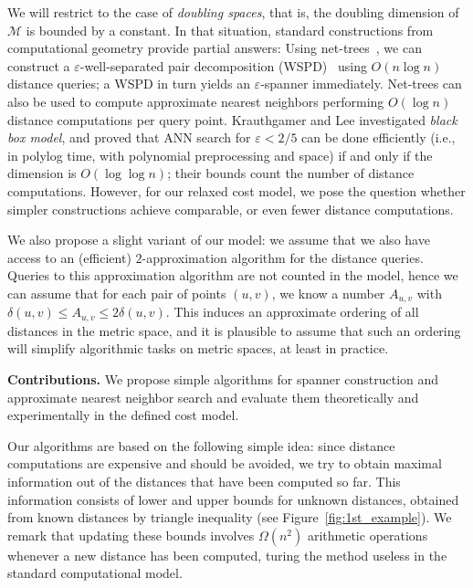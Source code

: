 \documentclass[a4paper,USenglish]{socg-lipics-v2018}
\newcommand{\eps}{\varepsilon}
\newcommand{\metricspace}{\mathcal{M}}
\newcommand{\dist}{\delta}
\newcommand{\myparagraph}[1]{\textbf{#1.}}
\begin{document}
We will restrict to the case of \emph{doubling spaces}, that is, the doubling dimension
of $\metricspace$ is bounded by a constant. 
In that situation, standard constructions from computational geometry provide partial answers:
Using net-trees~\cite{hm-fast}, we can construct a $\eps$-well-separated pair decomposition (WSPD)~\cite{CK-decomposition} using $O(n\log n)$ distance queries; a WSPD in turn yields
an $\eps$-spanner immediately. Net-trees can also be used to compute approximate nearest neighbors
performing $O(\log n)$ distance computations per query point.
Krauthgamer and Lee \cite{krauthgamer2005black} investigated \textit{black box model},
and proved that ANN search for $\eps < 2/5$ can be done efficiently (i.e., in polylog time, with polynomial preprocessing
and space) if and only if the dimension is $O(\log \log n)$; their bounds count the number of distance computations.
However, for our relaxed cost model, we pose the question whether simpler constructions achieve
comparable, or even fewer distance computations.

We also propose a slight variant of our model: we assume that we also have access to an (efficient)
$2$-approximation algorithm for the distance queries. Queries to this approximation algorithm
are not counted in the model, hence we can assume that for each pair of points $(u,v)$, we
know a number $A_{u,v}$ with $\dist(u,v)\leq A_{u,v}\leq 2\dist(u,v)$. This induces an approximate ordering
of all distances in the metric space, and it is plausible to assume that such an ordering will simplify
algorithmic tasks on metric spaces, at least in practice.

\myparagraph{Contributions}
%
We propose simple algorithms for spanner construction and approximate nearest neighbor search
and evaluate them theoretically and experimentally in the defined cost model.

Our algorithms are based on the following simple idea: since distance computations are expensive
and should be avoided, we try to obtain maximal information out of the distances that have been computed
so far. 
This information consists of lower and upper bounds for unknown distances, obtained from known distances
by triangle inequality (see Figure~\ref{fig:1st_example}). We remark that updating these bounds involves $\Omega(n^2)$ arithmetic
operations whenever a new distance has been computed, turing the method useless in the standard computational model.
\end{document}
